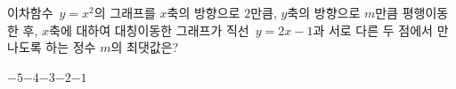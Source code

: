 이차함수~$y=x^2$의 그래프를 $x$축의 방향으로 $2$만큼, $y$축의 방향으로 $m$만큼 평행이동한 후, $x$축에 대하여 대칭이동한 그래프가 직선~$y=2x-1$과 서로 다른 두 점에서 만나도록 하는 정수 $m$의 최댓값은?
\begin{choices32}{$-5$}{$-4$}{$-3$}{$-2$}{$-1$}\end{choices32}
